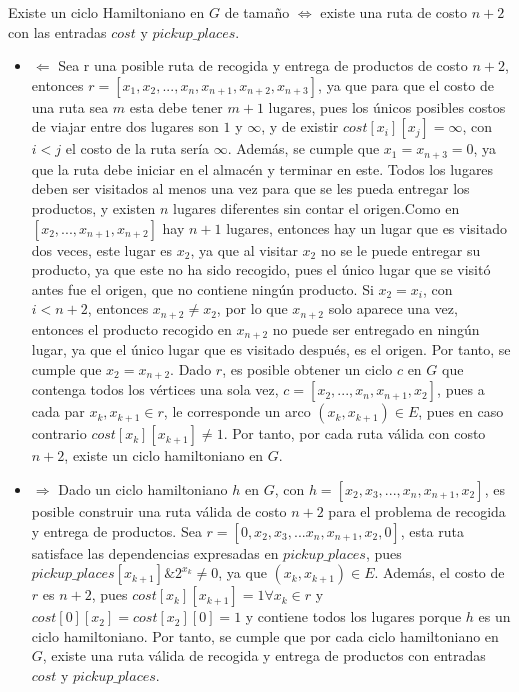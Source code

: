 \documentclass[twocolumn, fontsize=10pt]{article}
\begin{document}
Existe un ciclo Hamiltoniano en \( G \) de tamaño \(\iff\) existe una ruta de costo \(n+2\) con las entradas \(cost\) y \(pickup\_places\).

\begin{itemize}
    \item \(\Leftarrow\) 
    Sea r una posible ruta de recogida y entrega de productos de costo \(n+2\), entonces \(r = [x_1,x_2,...,x_n,x_{n+1},x_{n+2},x_{n+3}]\), ya que para que el costo de una ruta sea \(m\) esta debe tener \(m+1\) lugares, pues los únicos posibles costos de viajar entre dos lugares son \(1\) y \(\infty\), y de existir \(cost[x_i][x_j]= \infty\), con \(i<j\) el costo de la ruta sería \(\infty\). Además, se cumple que \(x_1=x_{n+3}=0\), ya que la ruta debe iniciar en el almacén y terminar en este. Todos los lugares deben ser visitados al menos una vez para que se les pueda entregar los productos, y existen \(n\) lugares diferentes sin contar el origen.Como en \([x_2,...,x_{n+1},x_{n+2}]\) hay \(n+1\) lugares, entonces hay un lugar que es visitado dos veces, este lugar es \(x_2\), ya que al visitar \(x_2\) no se le puede entregar su producto, ya que este no ha sido recogido, pues el único lugar que se visitó antes fue el origen, que no contiene ningún producto. Si \(x_2 = x_i\), con \(i<n+2\), entonces \(x_{n+2} \neq x_2\), por lo que \(x_{n+2}\) solo aparece una vez, entonces el producto recogido en \(x_{n+2}\) no puede ser entregado en ningún lugar, ya que el único lugar que es visitado después, es el origen. Por tanto, se cumple que \(x_2 = x_{n+2}\). Dado \(r\), es posible obtener un ciclo \(c\) en \(G\) que contenga todos los vértices una sola vez, \(c = [x_2,...,x_n,x_{n+1},x_2]\), pues a cada par \(x_k,x_{k+1} \in r\), le corresponde un arco \((x_k,x_{k+1}) \in E\), pues en caso contrario \(cost[x_k][x_{k+1}] \neq 1\). Por tanto, por cada ruta válida con costo \(n+2\), existe un ciclo hamiltoniano en \(G\).

    \item \(\Rightarrow\) 
    Dado un ciclo hamiltoniano \(h\) en \(G\), con \(h=[x_2,x_3,...,x_n,x_{n+1},x_2]\), es posible construir una ruta válida de costo \(n+2\) para el problema de recogida y entrega de productos. Sea \(r=[0,x_2,x_3,...x_n,x_{n+1},x_2,0]\), esta ruta satisface las dependencias expresadas en \(pickup\_places\), pues  \(pickup\_places[x_{k+1}] \& 2^{x_k} \neq 0\), ya que \((x_k,x_{k+1})\in E\). Además, el costo de \(r\) es \(n+2\), pues \(cost[x_k][x_{k+1}]=1 \forall x_k \in r \) y \(cost[0][x_2]=cost[x_2][0]=1\) y contiene todos los lugares porque \(h\) es un ciclo hamiltoniano. Por tanto, se cumple que por cada ciclo hamiltoniano en \(G\), existe una ruta válida de recogida y entrega de productos con entradas \(cost\) y \(pickup\_places\).
 
    

\end{itemize}
\end{document}
